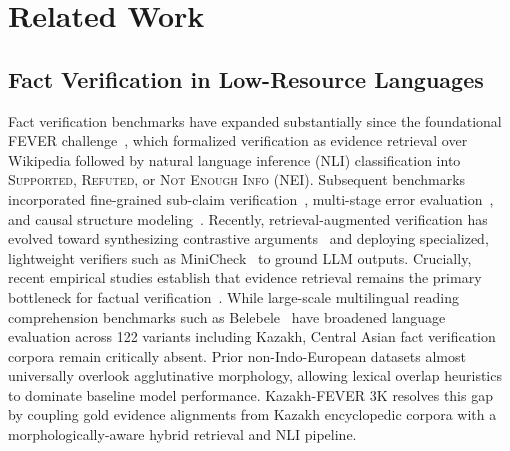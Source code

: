 \section{Related Work}
\label{sec:related}

\subsection{Fact Verification in Low-Resource Languages}
Fact verification benchmarks have expanded substantially since the foundational FEVER challenge~\citep{thorne2018fever}, which formalized verification as evidence retrieval over Wikipedia followed by natural language inference (NLI) classification into \textsc{Supported}, \textsc{Refuted}, or \textsc{Not Enough Info} (NEI). Subsequent benchmarks incorporated fine-grained sub-claim verification~\citep{mitra-etal-2025-factlens}, multi-stage error evaluation~\citep{wang-etal-2024-factcheck-bench}, and causal structure modeling~\citep{si-etal-2024-checkwhy}. Recently, retrieval-augmented verification has evolved toward synthesizing contrastive arguments~\citep{yue-etal-2024-retrieval} and deploying specialized, lightweight verifiers such as MiniCheck~\citep{tang-etal-2024-minicheck} to ground LLM outputs. Crucially, recent empirical studies establish that evidence retrieval remains the primary bottleneck for factual verification~\citep{zheng-etal-2024-evidence}. While large-scale multilingual reading comprehension benchmarks such as Belebele~\citep{bandarkar-etal-2024-belebele} have broadened language evaluation across 122 variants including Kazakh, Central Asian fact verification corpora remain critically absent. Prior non-Indo-European datasets almost universally overlook agglutinative morphology, allowing lexical overlap heuristics to dominate baseline model performance. Kazakh-FEVER 3K resolves this gap by coupling gold evidence alignments from Kazakh encyclopedic corpora with a morphologically-aware hybrid retrieval and NLI pipeline.

